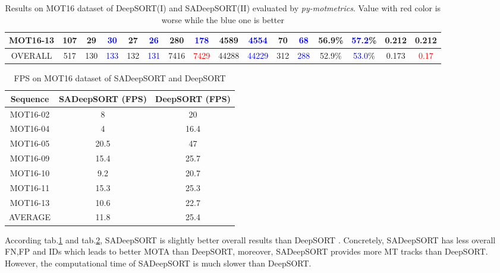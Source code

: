 \begin{landscape}
\begin{table}[H]
\begin{tabular}{||c|c|c|c|c|c|c|c|c|c|c|c|c|c|c|c||}
        MOT16-13 & 107 & 29  & \textcolor{blue}{30}  & 27  & \textcolor{blue}{26}  & 280  & \textcolor{blue}{178}  &  4589         & \textcolor{blue}{4554}  & 70  & \textcolor{blue}{68} & 56.9\% & \textcolor{blue}{57.2}\%  & 0.212 & 0.212          \\ \hline
        OVERALL  & 517 & 130 & \textcolor{blue}{133} & 132 & \textcolor{blue}{131} & 7416 & \textcolor{red}{7429}  &  44288        & \textcolor{blue}{44229} & 312 & \textcolor{blue}{288} & 52.9\% & \textcolor{blue}{53.0}\% & 0.173 & \textcolor{red}{0.17}          \\ \hline
    \end{tabular}
    \caption{Results on MOT16 dataset of DeepSORT(I) and SADeepSORT(II) evaluated by \textit{py-motmetrics}. Value with red color is worse while the blue one is better}
    \label{tab:sa_deepsort_result}
\end{table}
\end{landscape}

\pagebreak



\begin{table}[H]
    \begin{center}
     \begin{tabular}{||c | c | c ||} 
     \hline
    Sequence & SADeepSORT (\acrshort{FPS}) & DeepSORT\cite{Wojke2017simple} (\acrshort{FPS}) \\
    \hline
    \hline
    MOT16-02 & 8 & 20 \\
     \hline
    MOT16-04 & 4 & 16.4\\
    \hline
    MOT16-05 & 20.5 & 47 \\
    \hline
    MOT16-09 & 15.4 & 25.7 \\
    \hline
    MOT16-10 & 9.2 & 20.7\\
    \hline
    MOT16-11 &  15.3 &  25.3\\
    \hline
    MOT16-13 & 10.6 & 22.7\\
    \hline
    AVERAGE  & 11.8 & 25.4 \\
    
    \hline
    \end{tabular}
    \end{center}
        \caption{\acrshort{FPS} on MOT16 dataset\cite{Milan2016MOT16AB} of SADeepSORT and DeepSORT\cite{Wojke2017simple}}
        \label{tab:fps_com}
\end{table}

According tab.\ref{tab:sa_deepsort_result} and tab.\ref{tab:fps_com}, SADeepSORT is slightly better overall results than DeepSORT\cite{Wojke2017simple}
. Concretely, SADeepSORT has less overall \acrshort{FN},\acrshort{FP} and \acrshort{IDs} which leads to better \acrshort{MOTA} than DeepSORT\cite{Wojke2017simple}, moreover, 
SADeepSORT provides more \acrshort{MT} tracks than DeepSORT\cite{Wojke2017simple}. However, the computational time of SADeepSORT is much slower than DeepSORT\cite{Wojke2017simple}.



